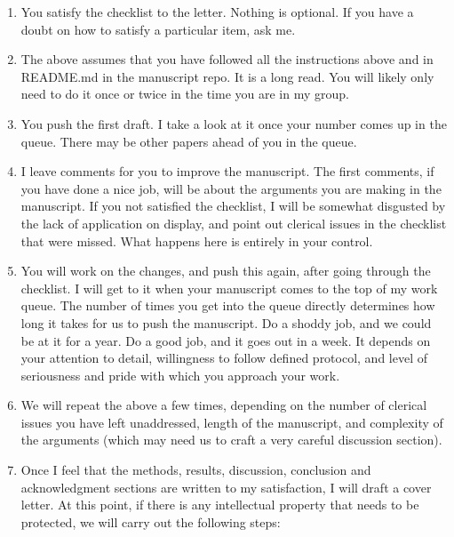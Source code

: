 \documentclass[12 pt]{article}
\begin{document}
\begin{enumerate}
\item You satisfy the checklist to the letter. Nothing is optional. If you have a doubt on how to satisfy a particular item, ask me.
\item The above assumes that you have followed all the instructions above and in README.md in the manuscript repo. It is a long read. You will likely only need to do it once or twice in the time you are in my group.
\item You push the first draft. I take a look at it once your number comes up in the queue. There may be other papers ahead of you in the queue.
\item I leave comments for you to improve the manuscript. The first comments, if you have done a nice job, will be about the arguments you are making in the manuscript. If you not satisfied the checklist, I will be somewhat disgusted by the lack of application on display, and point out clerical issues in the checklist that were missed. What happens here is entirely in your control.
\item You will work on the changes, and push this again, after going through the checklist. I will get to it when your manuscript comes to the top of my work queue. The number of times you get into the queue directly determines how long it takes for us to push the manuscript. Do a shoddy job, and we could be at it for a year. Do a good job, and it goes out in a week. It depends on your attention to detail, willingness to follow defined protocol, and level of seriousness and pride with which you approach your work.
\item We will repeat the above a few times, depending on the number of clerical issues you have left unaddressed, length of the manuscript, and complexity of the arguments (which may need us to craft a very careful discussion section).
\item Once I feel that the methods, results, discussion, conclusion and acknowledgment sections are written to my satisfaction, I will draft a cover letter. At this point, if there is any intellectual property that needs to be protected, we will carry out the following steps:


\end{enumerate}
\end{document}
